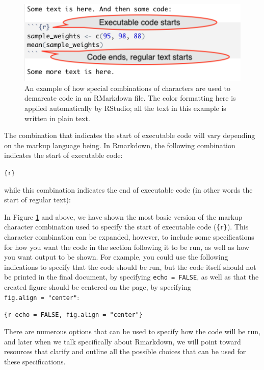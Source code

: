 \documentclass[]{tufte-book}
\begin{document}
\begin{figure}
\includegraphics[width=\textwidth]{figures/demarcating_code} \caption[An example of how special combinations of characters are used to demarcate code in an RMarkdown file]{An example of how special combinations of characters are used to demarcate code in an RMarkdown file. The color formatting here is applied automatically by RStudio; all the text in this example is written in plain text.}\label{fig:demarcatecode}
\end{figure}

The combination that indicates the start of executable code will vary depending
on the markup language being. In Rmarkdown, the following combination indicates
the start of executable code:

\texttt{\textasciigrave{}\textasciigrave{}\textasciigrave{}\{r\}}

\noindent while this combination indicates the end of executable code (in other
words the start of regular text):

\texttt{\textasciigrave{}\textasciigrave{}\textasciigrave{}}

In Figure \ref{fig:demarcatecode} and above, we have shown the most basic
version of the markup character combination used to specify the start of
executable code (\texttt{\textasciigrave{}\textasciigrave{}\textasciigrave{}\{r\}}). This character combination can be expanded,
however, to include some specifications for how you want the code in the section
following it to be run, as well as how you want output to be shown. For example,
you could use the following indications to specify that the code should be run,
but the code itself should not be printed in the final document, by specifying
\texttt{echo\ =\ FALSE}, as well as that the created figure should be centered on the
page, by specifying \texttt{fig.align\ =\ "center"}:

\texttt{\textasciigrave{}\textasciigrave{}\textasciigrave{}\{r\ echo\ =\ FALSE,\ fig.align\ =\ "center"\}}

There are numerous options that can be used to specify how the code will be run,
and later when we talk specifically about Rmarkdown, we will point toward
resources that clarify and outline all the possible choices that can be used for
these specifications.
\end{document}
